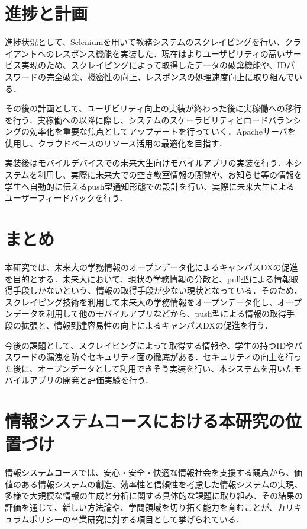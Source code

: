 \documentclass[11pt]{ujarticle}
\begin{document}
\section{進捗と計画}

進捗状況として、Seleniumを用いて教務システムのスクレイピングを行い、クライアントへのレスポンス機能を実装した．現在はよりユーザビリティの高いサービス実現のため、スクレイピングによって取得したデータの破棄機能や、IDパスワードの完全破棄、機密性の向上、レスポンスの処理速度向上に取り組んでいる．

その後の計画として、ユーザビリティ向上の実装が終わった後に実稼働への移行を行う．実稼働への以降に際し、システムのスケーラビリティとロードバランシングの効率化を重要な焦点としてアップデートを行っていく．Apacheサーバを使用し、クラウドベースのリソース活用の最適化を目指す．

実装後はモバイルデバイスでの未来大生向けモバイルアプリの実装を行う．本システムを利用し、実際に未来大での空き教室情報の閲覧や、お知らせ等の情報を学生へ自動的に伝えるpush型通知形態での設計を行い、実際に未来大生によるユーザーフィードバックを行う．

\section{まとめ}

本研究では、未来大の学務情報のオープンデータ化によるキャンパスDXの促進を目的とする．未来大において、現状の学務情報の分散と、pull型による情報取得手段しかないという、情報の取得手段が少ない現状となっている．そのため、スクレイピング技術を利用して未来大の学務情報をオープンデータ化し、オープンデータを利用して他のモバイルアプリなどから、push型による情報の取得手段の拡張と、情報到達容易性の向上によるキャンパスDXの促進を行う．

今後の課題として、スクレイピングによって取得する情報や、学生の持つIDやパスワードの漏洩を防ぐセキュリティ面の徹底がある．セキュリティの向上を行った後に、オープンデータとして利用できそう実装を行い、本システムを用いたモバイルアプリの開発と評価実験を行う．

\section{情報システムコースにおける本研究の位置づけ}

情報システムコースでは、安心・安全・快適な情報社会を支援する観点から、価値のある情報システムの創造、効率性と信頼性を考慮した情報システムの実現、多様で大規模な情報の生成と分析に関する具体的な課題に取り組み、その結果の評価を通じて、新しい方法論や、学問領域を切り拓く能力を育むことが、カリキュラムポリシーの卒業研究に対する項目として挙げられている．
\end{document}
